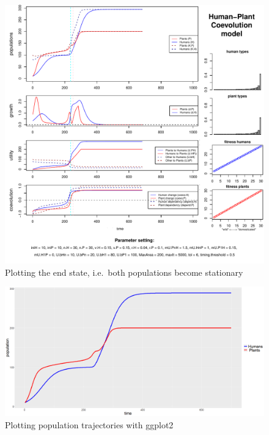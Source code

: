\documentclass[
]{book}
\begin{document}
\begin{figure}
\centering
\includegraphics{hpcModel-exploration_files/figure-latex/1runcoevocoetaplot-1.pdf}
\caption{\label{fig:1runcoevocoetaplot}Plotting the end state, i.e.~both populations become stationary}
\end{figure}

\newpage

\begin{figure}
\includegraphics[width=1\linewidth]{plots/1_singleRun-ggplot-run.coevo.coeta} \caption{Plotting population trajectories with ggplot2}\label{fig:1runcoevocoetaggplotprint}
\end{figure}

\newpage
\end{document}
